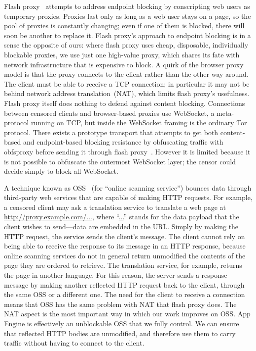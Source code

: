 \documentclass{article}
\begin{document}
Flash proxy~\cite{flashproxy} attempts to address endpoint blocking by
conscripting web users as temporary proxies. Proxies last only as long as a web
user stays on a page, so the pool of proxies is constantly changing;
even if one of them is blocked, there will soon be another to replace it.
Flash proxy's approach to endpoint blocking is in a sense
the opposite of ours: where flash proxy uses cheap, disposable, individually blockable proxies,
we use just one high-value proxy, which shares its fate with network
infrastructure that is expensive to block.
A quirk of the browser proxy model is that the proxy connects to the client rather than the other way around.
The client must be able to receive a TCP connection; in particular it
may not be behind network address translation~(NAT), which limits flash proxy's usefulness.
Flash proxy itself does nothing to defend against content blocking.
Connections between censored clients and browser-based proxies use
WebSocket, a meta-protocol running on TCP,
but inside the WebSocket framing is the ordinary Tor protocol.
There exists a prototype transport that attempts to get both
content-based and endpoint-based blocking resistance by obfuscating traffic
with obfsproxy before sending it through flash proxy~\cite{obfs-flash}.
However it is limited because it is not
possible to obfuscate the outermost WebSocket layer;
the censor could decide simply to block all WebSocket.


A technique known as OSS~\cite{oss} (for
``online scanning service'') bounces data
through third-party web services that are capable of making HTTP requests.
For example, a censored client may ask a translation service to
translate a web page at \url{http://proxy.example.com/...}, where ``\url{...}''
stands for the data payload that the client wishes to send---data are embedded in the URL.
Simply by making the HTTP request, the service sends the client's message.
The client cannot rely on being able to receive the response to its message in an HTTP response,
because online scanning services do not in general
return unmodified the contents of the page they are ordered to retrieve.
The translation service, for example, returns the page in another language.
For this reason, the server sends a response message by making
another reflected HTTP request back to the client, through the same OSS or a different one.
The need for the client to receive a connection means that OSS has the same problem with NAT that flash proxy does.
The NAT aspect is the most important way in which our work improves on OSS.
App Engine is effectively an unblockable OSS that we fully control.
We can ensure that reflected HTTP bodies are unmodified, and therefore use them to carry traffic
without having to connect to the client.
\end{document}
